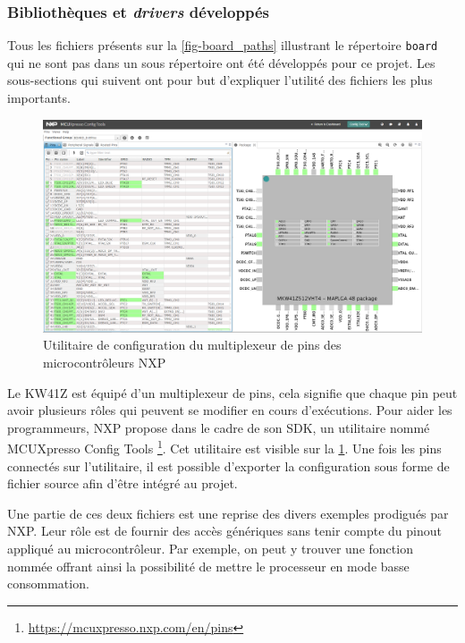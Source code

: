 \subsubsection{Bibliothèques et \textit{drivers} développés}

Tous les fichiers présents sur la \cref{fig-board_paths} illustrant le répertoire \texttt{board} qui ne sont pas dans un sous répertoire ont été développés pour ce projet. Les sous-sections qui suivent ont pour but d'expliquer l'utilité des fichiers les plus importants. 



\begin{figure}[ht!]
    \centering
    \includegraphics[width=1.0\textwidth]{Figures/Software/kw41z/mcuxpresso_pin_tools.PNG}
    \caption{Utilitaire de configuration du multiplexeur de pins des microcontrôleurs NXP}
    \label{fig-mcuxpresso_pin_tools}
\end{figure}


Le KW41Z est équipé d'un multiplexeur de pins, cela signifie que chaque pin peut avoir plusieurs rôles qui peuvent se modifier en cours d'exécutions. Pour aider les programmeurs, NXP propose dans le cadre de son SDK, un utilitaire nommé MCUXpresso Config Tools \footnote{\url{https://mcuxpresso.nxp.com/en/pins}}. Cet utilitaire est visible sur la \cref{fig-mcuxpresso_pin_tools}. Une fois les pins connectés sur l'utilitaire, il est possible d'exporter la configuration sous forme de fichier source afin d'être intégré au projet.



Une partie de ces deux fichiers est une reprise des divers exemples prodigués par NXP. Leur rôle est de fournir des accès génériques sans tenir compte du pinout appliqué au microcontrôleur. Par exemple, on peut y trouver une fonction nommée  offrant ainsi la possibilité de mettre le processeur en mode basse consommation. 


